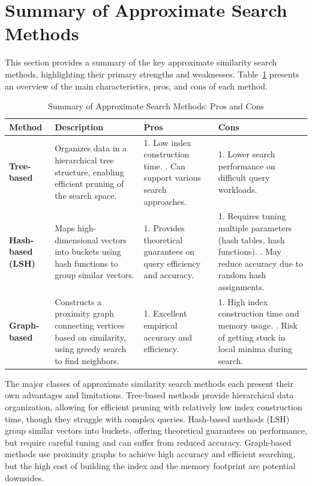 \section{Summary of Approximate Search Methods}
\label{sec:summary_search_methods}

This section provides a summary of the key approximate similarity search methods, highlighting their primary strengths and weaknesses. Table~\ref{tab:methods_summary} presents an overview of the main characteristics, pros, and cons of each method.

\begin{table}[ht]
\centering
\begin{tabular}{|p{3cm}|p{4cm}|p{4cm}|p{4cm}|}
\hline
\textbf{Method} & \textbf{Description} & \textbf{Pros} & \textbf{Cons} \\ \hline
\textbf{Tree-based} & Organizes data in a hierarchical tree structure, enabling efficient pruning of the search space. & 
1. Low index construction time.
\newline 
2. Can support various search approaches.
& 
1. Lower search performance on difficult query workloads. \\ \hline

\textbf{Hash-based (LSH)} & Maps high-dimensional vectors into buckets using hash functions to group similar vectors. & 
1. Provides theoretical guarantees on query efficiency and accuracy. & 
1. Requires tuning multiple parameters (hash tables, hash functions). \newline 2. May reduce accuracy due to random hash assignments. \\ \hline

\textbf{Graph-based} & Constructs a proximity graph connecting vertices based on similarity, using greedy search to find neighbors. & 
1. Excellent empirical accuracy and efficiency.
& 
1. High index construction time and memory usage. \newline 2. Risk of getting stuck in local minima during search. \\ \hline
\end{tabular}
\caption{Summary of Approximate Search Methods: Pros and Cons}
\label{tab:methods_summary}
\end{table}

The major classes of approximate similarity search methods each present their own advantages and limitations. Tree-based methods provide hierarchical data organization, allowing for efficient pruning with relatively low index construction time, though they struggle with complex queries. Hash-based methods (LSH) group similar vectors into buckets, offering theoretical guarantees on performance, but require careful tuning and can suffer from reduced accuracy. Graph-based methods use proximity graphs to achieve high accuracy and efficient searching, but the high cost of building the index and the memory footprint are potential downsides.

